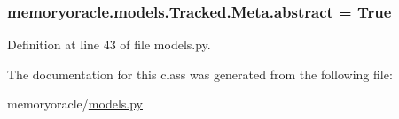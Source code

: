 \subsubsection[{abstract}]{\setlength{\rightskip}{0pt plus 5cm}memoryoracle.\+models.\+Tracked.\+Meta.\+abstract = True\hspace{0.3cm}{\ttfamily [static]}}\label{classmemoryoracle_1_1models_1_1Tracked_1_1Meta_aca9b8e599664f262b2cca127c3c11d3e}


Definition at line 43 of file models.\+py.



The documentation for this class was generated from the following file\+:\begin{DoxyCompactItemize}
\item 
memoryoracle/\hyperlink{models_8py}{models.\+py}\end{DoxyCompactItemize}

